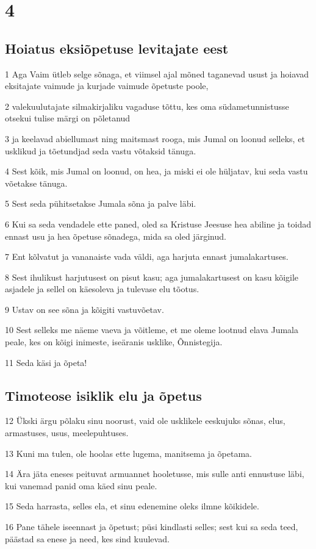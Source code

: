 \chapter{4}

\section*{Hoiatus eksiõpetuse levitajate eest}

\par 1 Aga Vaim ütleb selge sõnaga, et viimsel ajal mõned taganevad usust ja hoiavad eksitajate vaimude ja kurjade vaimude õpetuste poole,
\par 2 valekuulutajate silmakirjaliku vagaduse tõttu, kes oma südametunnistusse otsekui tulise märgi on põletanud
\par 3 ja keelavad abiellumast ning maitsmast rooga, mis Jumal on loonud selleks, et usklikud ja tõetundjad seda vastu võtaksid tänuga.
\par 4 Sest kõik, mis Jumal on loonud, on hea, ja miski ei ole hüljatav, kui seda vastu võetakse tänuga.
\par 5 Sest seda pühitsetakse Jumala sõna ja palve läbi.
\par 6 Kui sa seda vendadele ette paned, oled sa Kristuse Jeesuse hea abiline ja toidad ennast usu ja hea õpetuse sõnadega, mida sa oled järginud.
\par 7 Ent kõlvatut ja vananaiste vada väldi, aga harjuta ennast jumalakartuses.
\par 8 Sest ihulikust harjutusest on pisut kasu; aga jumalakartusest on kasu kõigile asjadele ja sellel on käesoleva ja tulevase elu tõotus.
\par 9 Ustav on see sõna ja kõigiti vastuvõetav.
\par 10 Sest selleks me näeme vaeva ja võitleme, et me oleme lootnud elava Jumala peale, kes on kõigi inimeste, iseäranis usklike, Õnnistegija.
\par 11 Seda käsi ja õpeta!

\section*{Timoteose isiklik elu ja õpetus}

\par 12 Ükski ärgu põlaku sinu noorust, vaid ole usklikele eeskujuks sõnas, elus, armastuses, usus, meelepuhtuses.
\par 13 Kuni ma tulen, ole hoolas ette lugema, manitsema ja õpetama.
\par 14 Ära jäta eneses peituvat armuannet hooletusse, mis sulle anti ennustuse läbi, kui vanemad panid oma käed sinu peale.
\par 15 Seda harrasta, selles ela, et sinu edenemine oleks ilmne kõikidele.
\par 16 Pane tähele iseennast ja õpetust; püsi kindlasti selles; sest kui sa seda teed, päästad sa enese ja need, kes sind kuulevad.


